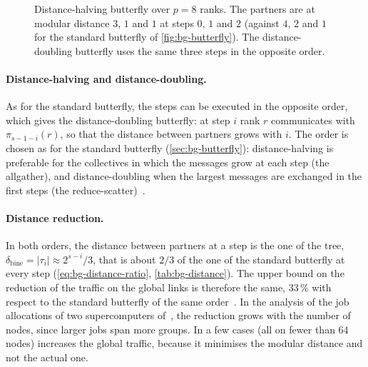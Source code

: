 \begin{figure}[t]
  \centering
  \caption{Distance-halving \bine{} butterfly over $p=8$ ranks. The partners are at modular distance $3$, $1$ and $1$ at steps $0$, $1$ and $2$ (against $4$, $2$ and $1$ for the standard butterfly of \cref{fig:bg-butterfly}). The distance-doubling \bine{} butterfly uses the same three steps in the opposite order.}
  \label{fig:bg-bine-butterfly}
\end{figure}

\paragraph{Distance-halving and distance-doubling.}
As for the standard butterfly, the steps can be executed in the opposite order, which gives the distance-doubling \bine{} butterfly: at step $i$ rank $r$ communicates with $\pi_{s-1-i}(r)$, so that the distance between partners grows with $i$.
The order is chosen as for the standard butterfly (\cref{sec:bg-butterfly}): distance-halving is preferable for the collectives in which the messages grow at each step (the allgather), and distance-doubling when the largest messages are exchanged in the first steps (the reduce-scatter)~\cite{desensi2025bine}.

\paragraph{Distance reduction.}
In both orders, the distance between partners at a step is the one of the \bine{} tree, $\delta_{\text{bine}}=\lvert\tau_i\rvert\approx 2^{s-i}/3$, that is about $2/3$ of the one of the standard butterfly at every step (\cref{eq:bg-distance-ratio}, \cref{tab:bg-distance}).
The upper bound on the reduction of the traffic on the global links is therefore the same, $33\,\%$ with respect to the standard butterfly of the same order~\cite{desensi2025bine}.
In the analysis of the job allocations of two supercomputers of~\cite{desensi2025bine}, the reduction grows with the number of nodes, since larger jobs span more groups. In a few cases (all on fewer than $64$ nodes) \bine{} increases the global traffic, because it minimises the modular distance and not the actual one.

